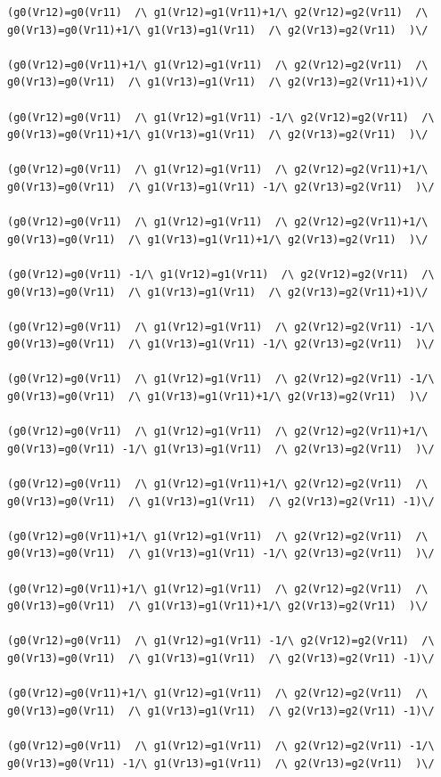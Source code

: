 \begin{appendices}
\begin{lstlisting}
(g0(Vr12)=g0(Vr11)  /\ g1(Vr12)=g1(Vr11)+1/\ g2(Vr12)=g2(Vr11)  /\ g0(Vr13)=g0(Vr11)+1/\ g1(Vr13)=g1(Vr11)  /\ g2(Vr13)=g2(Vr11)  )\/ 

(g0(Vr12)=g0(Vr11)+1/\ g1(Vr12)=g1(Vr11)  /\ g2(Vr12)=g2(Vr11)  /\ g0(Vr13)=g0(Vr11)  /\ g1(Vr13)=g1(Vr11)  /\ g2(Vr13)=g2(Vr11)+1)\/ 

(g0(Vr12)=g0(Vr11)  /\ g1(Vr12)=g1(Vr11) -1/\ g2(Vr12)=g2(Vr11)  /\ g0(Vr13)=g0(Vr11)+1/\ g1(Vr13)=g1(Vr11)  /\ g2(Vr13)=g2(Vr11)  )\/ 

(g0(Vr12)=g0(Vr11)  /\ g1(Vr12)=g1(Vr11)  /\ g2(Vr12)=g2(Vr11)+1/\ g0(Vr13)=g0(Vr11)  /\ g1(Vr13)=g1(Vr11) -1/\ g2(Vr13)=g2(Vr11)  )\/ 

(g0(Vr12)=g0(Vr11)  /\ g1(Vr12)=g1(Vr11)  /\ g2(Vr12)=g2(Vr11)+1/\ g0(Vr13)=g0(Vr11)  /\ g1(Vr13)=g1(Vr11)+1/\ g2(Vr13)=g2(Vr11)  )\/ 

(g0(Vr12)=g0(Vr11) -1/\ g1(Vr12)=g1(Vr11)  /\ g2(Vr12)=g2(Vr11)  /\ g0(Vr13)=g0(Vr11)  /\ g1(Vr13)=g1(Vr11)  /\ g2(Vr13)=g2(Vr11)+1)\/ 

(g0(Vr12)=g0(Vr11)  /\ g1(Vr12)=g1(Vr11)  /\ g2(Vr12)=g2(Vr11) -1/\ g0(Vr13)=g0(Vr11)  /\ g1(Vr13)=g1(Vr11) -1/\ g2(Vr13)=g2(Vr11)  )\/ 

(g0(Vr12)=g0(Vr11)  /\ g1(Vr12)=g1(Vr11)  /\ g2(Vr12)=g2(Vr11) -1/\ g0(Vr13)=g0(Vr11)  /\ g1(Vr13)=g1(Vr11)+1/\ g2(Vr13)=g2(Vr11)  )\/ 

(g0(Vr12)=g0(Vr11)  /\ g1(Vr12)=g1(Vr11)  /\ g2(Vr12)=g2(Vr11)+1/\ g0(Vr13)=g0(Vr11) -1/\ g1(Vr13)=g1(Vr11)  /\ g2(Vr13)=g2(Vr11)  )\/ 

(g0(Vr12)=g0(Vr11)  /\ g1(Vr12)=g1(Vr11)+1/\ g2(Vr12)=g2(Vr11)  /\ g0(Vr13)=g0(Vr11)  /\ g1(Vr13)=g1(Vr11)  /\ g2(Vr13)=g2(Vr11) -1)\/ 

(g0(Vr12)=g0(Vr11)+1/\ g1(Vr12)=g1(Vr11)  /\ g2(Vr12)=g2(Vr11)  /\ g0(Vr13)=g0(Vr11)  /\ g1(Vr13)=g1(Vr11) -1/\ g2(Vr13)=g2(Vr11)  )\/ 

(g0(Vr12)=g0(Vr11)+1/\ g1(Vr12)=g1(Vr11)  /\ g2(Vr12)=g2(Vr11)  /\ g0(Vr13)=g0(Vr11)  /\ g1(Vr13)=g1(Vr11)+1/\ g2(Vr13)=g2(Vr11)  )\/ 

(g0(Vr12)=g0(Vr11)  /\ g1(Vr12)=g1(Vr11) -1/\ g2(Vr12)=g2(Vr11)  /\ g0(Vr13)=g0(Vr11)  /\ g1(Vr13)=g1(Vr11)  /\ g2(Vr13)=g2(Vr11) -1)\/ 

(g0(Vr12)=g0(Vr11)+1/\ g1(Vr12)=g1(Vr11)  /\ g2(Vr12)=g2(Vr11)  /\ g0(Vr13)=g0(Vr11)  /\ g1(Vr13)=g1(Vr11)  /\ g2(Vr13)=g2(Vr11) -1)\/ 

(g0(Vr12)=g0(Vr11)  /\ g1(Vr12)=g1(Vr11)  /\ g2(Vr12)=g2(Vr11) -1/\ g0(Vr13)=g0(Vr11) -1/\ g1(Vr13)=g1(Vr11)  /\ g2(Vr13)=g2(Vr11)  )\/ 


\end{lstlisting}
\end{appendices}
